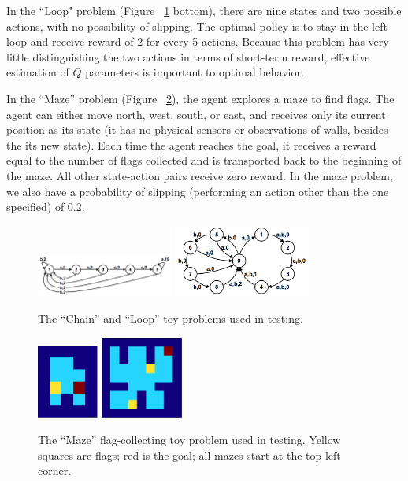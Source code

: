\documentclass[10pt, twocolumn, twoside]{article}
\begin{document}
In the ``Loop" problem (Figure ~\ref{fig:chainloop} bottom), there are nine states and
two possible actions, with no possibility of slipping. The optimal policy is to stay
in the left loop and receive reward of 2 for every 5 actions. Because this problem has
very little distinguishing the two actions in terms of short-term reward, effective
estimation of $Q$ parameters is important to optimal behavior.

In the ``Maze'' problem (Figure ~\ref{fig:maze}), the agent explores a maze to find
flags. The agent can either move north, west, south, or east, and receives only its
current position as its state (it has no physical sensors or observations of walls,
besides the its new state). Each time the agent reaches the goal, it receives a reward
equal to the number of flags collected and is transported back to the beginning of the
maze. All other state-action pairs receive zero reward. In the maze problem, we also
have a probability of slipping (performing an action other than the one specified) of 0.2.

\begin{figure}
\centering
\includegraphics[width=0.4\textwidth]{chain.png}
\includegraphics[width=0.4\textwidth]{loop.png}
\caption{\label{fig:chainloop} The ``Chain'' and ``Loop'' toy problems used in testing.}
\end{figure}

\begin{figure}
\centering
\includegraphics[width=0.18\textwidth]{easymaze.png}
\includegraphics[width=0.24\textwidth]{hardmaze.png}
\caption{\label{fig:maze} The ``Maze'' flag-collecting toy problem used in testing.
Yellow squares are flags; red is the goal; all mazes start at the top left corner.}
\end{figure}
\end{document}
